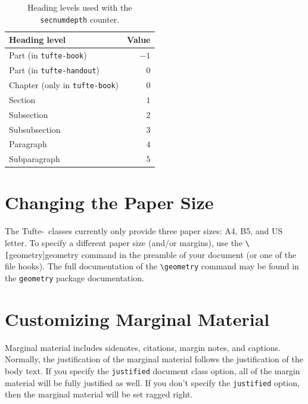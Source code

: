 \documentclass[a4paper]{tufte-handout}
\newcommand{\TL}{Tufte-\hologo{LaTeX}\xspace}
\newcommand{\hlorange}[1]{\textcolor{tufte-orange}{#1}}
\newcommand{\doccmd}[1]{\hlorange{\texttt{\textbackslash#1}}}
\newcommand{\docpkg}[1]{\hlorange{\texttt{#1}}}
\newcommand{\doccls}[1]{\texttt{#1}}
\newcommand{\docclsopt}[1]{\hlorange{\texttt{#1}}}
\begin{document}
\begin{table}
  \footnotesize
  \begin{center}
    \begin{tabular}{lr}
      \toprule
      Heading level                         & Value \\
      \midrule
      Part (in \doccls{tufte-book})         & \(-1\) \\
      Part (in \doccls{tufte-handout})      & \(0\) \\
      Chapter (only in \doccls{tufte-book}) & \(0\) \\
      Section                               & \(1\) \\
      Subsection                            & \(2\) \\
      Subsubsection                         & \(3\) \\
      Paragraph                             & \(4\) \\
      Subparagraph                          & \(5\) \\
      \bottomrule
    \end{tabular}
  \end{center}
  \caption{Heading levels used with the \texttt{secnumdepth} counter.}%
  \label{tab:secnumdepth-values}
\end{table}


\section{Changing the Paper Size}%
\label{sec:paper-size}

The \TL\ classes currently only provide three paper sizes: \textsc{A4}, \textsc{B5}, and \textsc{US} letter.
To specify a different paper size (and/or margins), use the \doccmd[geometry]{geometry} command in the preamble of your
document (or one of the file hooks).
The full documentation of the \doccmd{geometry} command may be found in the \docpkg{geometry} package documentation.%
\cite{pkg-geometry}


\section{Customizing Marginal Material}\label{sec:customizing-marginal-material}
Marginal material includes sidenotes, citations, margin notes, and captions.
Normally, the justification of the marginal material follows the justification of the body text. 
If you specify the \docclsopt{justified} document class option, all of the margin material will be fully justified as well. 
If you don't specify the \docclsopt{justified} option, then the marginal material will be set ragged right.
\end{document}

